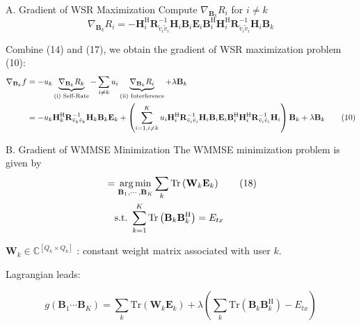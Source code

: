 \documentclass[aspectratio=169, 10pt]{beamer}
\begin{document}
\begin{frame}[label=main-wsr_Ri2]{A. Gradient of WSR Maximization}
    Compute $\nabla_{\mathbf{B}_k} R_i$ for $i \neq k$
    \begin{equation}
        \nabla_{\mathbf{B}_{k}}R_{i}=
        -\mathbf{H}_i^\mathrm{H} \mathbf{R}_{\tilde{v}_i\tilde{v}_i}^{-1} \mathbf{H}_i \mathbf{B}_i \mathbf{E}_i
        \mathbf{B}_i^\mathrm{H}
        \mathbf{H}_i^\mathrm{H} \mathbf{R}_{\tilde{v}_i\tilde{v}_i}^{-1} \mathbf{H}_i \mathbf{B}_k
        \tag{17}
    \end{equation}

    \begin{flushright}
        \hyperlink{app-wsr_Ri2}{}
    \end{flushright}

    Combine (14) and (17), we obtain the gradient of WSR maximization problem (10):
    \begin{align}
        \nabla_{\mathbf{B}_k} f
         & = -u_k \underbrace{ \nabla_{\mathbf{B}_k} R_k }_{\textrm{(i) Self-Rate}} - \sum_{i \neq k} u_i \underbrace{ \nabla_{\mathbf{B}_k} R_i }_{\textrm{(ii) Interference}} + \lambda \mathbf{B}_k \notag \\
         & = -u_k\mathbf{H}_k^\mathrm{H} \mathbf{R}_{\tilde{v}_k\tilde{v}_k}^{-1} \mathbf{H}_k \mathbf{B}_k \mathbf{E}_k
        + \left(
        \sum_{i=1,i\ne k}^K u_i\mathbf{H}_i^\mathrm{H} \mathbf{R}_{\tilde{v}_i\tilde{v}_i}^{-1} \mathbf{H}_i \mathbf{B}_i \mathbf{E}_i
        \mathbf{B}_i^\mathrm{H}
        \mathbf{H}_i^\mathrm{H} \mathbf{R}_{\tilde{v}_i\tilde{v}_i}^{-1} \mathbf{H}_i
        \right)\mathbf{B}_k + \lambda \mathbf{B}_k \tag{10}
    \end{align}


\end{frame}

\begin{frame}{B. Gradient of WMMSE Minimization}
    The WMMSE minimization problem is given by
    \begin{align}
        [\mathbf{B}_1^{\mathrm{MMSE}}, \cdots, \mathbf{B}_K^{\mathrm{MMSE}}]
         & = \underset{\mathbf{B}_1, \cdots, \mathbf{B}_K}{\operatorname{arg\,min}} \sum_k \mathrm{Tr}\left(\mathbf{W}_k \mathbf{E}_k\right) \tag{18} \\
         & \quad \textrm{s.t.} \ \sum_{k=1}^K \mathrm{Tr}\left(\mathbf{B}_k \mathbf{B}_k^\mathrm{H}\right) = E_{tx} \notag
    \end{align}

    $\mathbf{W}_k \in \mathbb{C}^{\left[ Q_k \times Q_k \right]}$ : constant weight matrix associated with user $k$.

    Lagrangian leads:

    \begin{equation}
        g\left(\mathbf{B}_1\cdots\mathbf{B}_K\right) = \sum_k \mathrm{Tr}\left(\mathbf{W}_k \mathbf{E}_k\right)
        + \lambda \left(
        \sum_k \mathrm{Tr}\left(\mathbf{B}_k \mathbf{B}_k^\mathrm{H}\right) - E_{tx}
        \right) \tag{19}
    \end{equation}

\end{frame}
\end{document}
